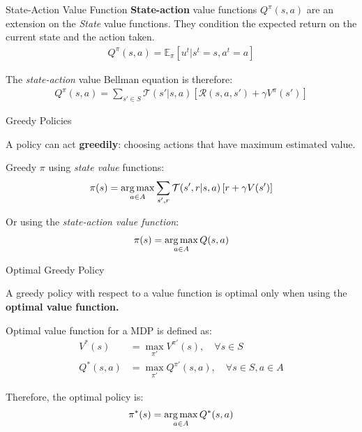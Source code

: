 \begin{frame}{State-Action Value Function}
    \textbf{State-action} value functions $Q^{\pi}(s,a)$ are an extension on the \textit{State} value functions. They condition the expected return on the current state and the action taken.
    \begin{align*}
         Q^{\pi}(s,a) = \mathbb{E}_{\pi}\left[u^{t}|s^{t}=s, a^{t}=a\right]
    \end{align*}

The \textit{state-action} value Bellman equation is therefore:
\vspace{10pt}
\begin{align*}
    Q^{\pi}(s,a) = \sum_{s' \in S} \mathcal{T}(s'|s,a) \left[\mathcal{R}(s,a,s') + \gamma V^{\pi}(s')\right]
\end{align*}

\end{frame}

\begin{frame}{Greedy Policies}

    A policy can act \textbf{greedily}: choosing actions that have maximum estimated value.
    \vspace{10pt}
    
    Greedy $\pi$ using \textit{state value} functions:
    \vspace{5pt}    
    \begin{align*}
       \pi(s) = \operatorname*{arg\,max}_{a \in A} \sum_{s', r} \mathcal{T}(s', r | s, a) \left[ r + \gamma V(s') \right]
    \end{align*}
    
    Or using the \textit{state-action value function}:
    \vspace{5pt}
    \begin{align*}
        \pi(s) = \operatorname*{arg\,max}_{a \in A}Q(s, a)    
    \end{align*}
    
\end{frame}

\begin{frame}[t]{Optimal Greedy Policy}

   A greedy policy with respect to a value function is optimal only when using the \textbf{optimal value function.} 
    
    Optimal value function for a MDP is defined as:
    \vspace{5pt}
    \begin{align*}
        V^{*}(s) &= \max_{\pi'} V^{\pi'}(s), \quad \forall s \in S \\
        Q^{*}(s, a) &= \max_{\pi'} Q^{\pi'}(s, a), \quad \forall s \in S, a \in A
    \end{align*}

    Therefore, the optimal policy is:
    \vspace{5pt}
    \begin{align*}
        \pi^{*}(s) = \operatorname*{arg\,max}_{a \in A}Q^{*}(s, a)    
    \end{align*}
\end{frame}

